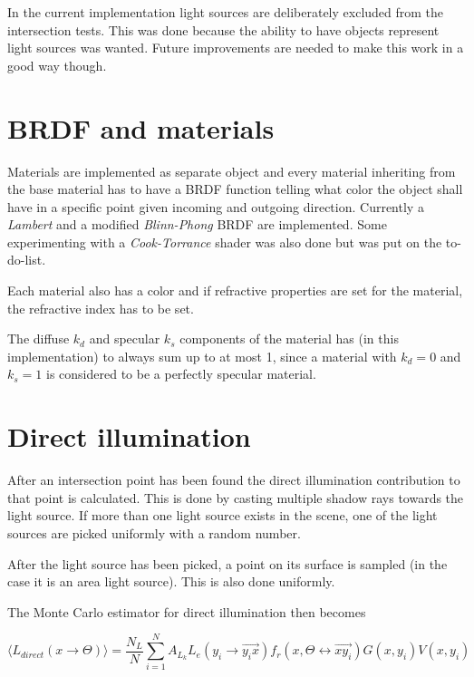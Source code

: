 \documentclass[a4paper]{report}
\begin{document}
In the current implementation light sources are deliberately excluded
from the intersection tests. This was done because the ability to have
objects represent light sources was wanted. Future improvements are
needed to make this work in a good way though.

\section{BRDF and materials}

Materials are implemented as separate object and every material
inheriting from the base material has to have a BRDF function telling
what color the object shall have in a specific point given incoming
and outgoing direction. Currently a \emph{Lambert} and a modified \emph{Blinn-Phong}
BRDF are implemented. Some experimenting with a \emph{Cook-Torrance} shader
was also done but was put on the to-do-list.

Each material also has a color and if refractive properties are set
for the material, the refractive index has to be set.

The diffuse \(k_d\) and specular \(k_s\) components of the material
has (in this implementation) to always sum up to at most 1, since a
material with \(k_d = 0\) and \(k_s = 1\) is considered to be a
perfectly specular material.

\section{Direct illumination}

After an intersection point has been found the direct illumination
contribution to that point is calculated. This is done by casting
multiple shadow rays towards the light source. If more than one light
source exists in the scene, one of the light sources are picked
uniformly with a random number.

After the light source has been picked, a point on its surface is
sampled (in the case it is an area light source). This is also done uniformly.

\pagebreak

The Monte Carlo estimator for direct illumination then becomes

\begin{equation}
  \langle L_{direct}(x \to \Theta) \rangle = \frac{N_L}{N}\sum^N_{i=1}
  A_{L_k}L_e(y_i \to \vec{y_ix})f_r(x,\Theta \leftrightarrow
  \vec{xy_i})G(x,y_i)V(x,y_i)
  \label{eq:direst}
\end{equation}
\end{document}
